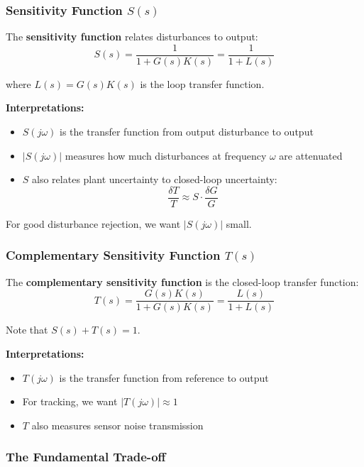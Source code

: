 \subsubsection{Sensitivity Function $S(s)$}

The \textbf{sensitivity function} relates disturbances to output:
\begin{equation}
S(s) = \frac{1}{1 + G(s)K(s)} = \frac{1}{1 + L(s)}
\label{eq:sensitivity}
\end{equation}

where $L(s) = G(s)K(s)$ is the loop transfer function.

\textbf{Interpretations:}
\begin{itemize}
    \item $S(j\omega)$ is the transfer function from output disturbance to output
    \item $|S(j\omega)|$ measures how much disturbances at frequency $\omega$ are attenuated
    \item $S$ also relates plant uncertainty to closed-loop uncertainty:
    \begin{equation}
    \frac{\delta T}{T} \approx S \cdot \frac{\delta G}{G}
    \end{equation}
\end{itemize}

For good disturbance rejection, we want $|S(j\omega)|$ small.

\subsubsection{Complementary Sensitivity Function $T(s)$}

The \textbf{complementary sensitivity function} is the closed-loop transfer function:
\begin{equation}
T(s) = \frac{G(s)K(s)}{1 + G(s)K(s)} = \frac{L(s)}{1 + L(s)}
\label{eq:comp_sensitivity}
\end{equation}

Note that $S(s) + T(s) = 1$.

\textbf{Interpretations:}
\begin{itemize}
    \item $T(j\omega)$ is the transfer function from reference to output
    \item For tracking, we want $|T(j\omega)| \approx 1$
    \item $T$ also measures sensor noise transmission
\end{itemize}

\subsubsection{The Fundamental Trade-off}

